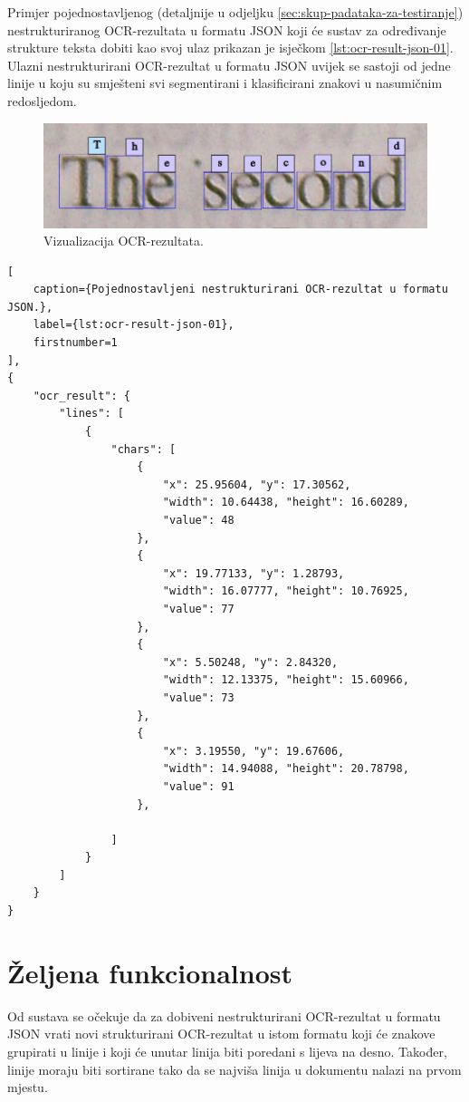 \documentclass[times, utf8, zavrsni]{fer}
\begin{document}
Primjer pojednostavljenog (detaljnije u odjeljku
\ref{sec:skup-padataka-za-testiranje}) nestrukturiranog OCR-rezultata u formatu
JSON koji će sustav za određivanje strukture teksta dobiti kao svoj ulaz
prikazan je isječkom \ref{lst:ocr-result-json-01}. Ulazni nestrukturirani
OCR-rezultat u formatu JSON uvijek se sastoji od jedne linije u koju
su smješteni svi segmentirani i klasificirani znakovi u nasumičnim redosljedom.

\begin{figure}[htb]
    \centering
    \includegraphics[width=\textwidth]{images/book-example-02.png}
    \caption{Vizualizacija OCR-rezultata.}
    \label{fig:book-example-02}
\end{figure}

\begin{lstlisting}[
    caption={Pojednostavljeni nestrukturirani OCR-rezultat u formatu JSON.},
    label={lst:ocr-result-json-01},
    firstnumber=1
],
{
    "ocr_result": {
        "lines": [
            {
                "chars": [
                    {
                        "x": 25.95604, "y": 17.30562,
                        "width": 10.64438, "height": 16.60289,
                        "value": 48
                    },
                    {
                        "x": 19.77133, "y": 1.28793,
                        "width": 16.07777, "height": 10.76925,
                        "value": 77
                    },
                    {
                        "x": 5.50248, "y": 2.84320,
                        "width": 12.13375, "height": 15.60966,
                        "value": 73
                    },
                    {
                        "x": 3.19550, "y": 19.67606,
                        "width": 14.94088, "height": 20.78798,
                        "value": 91
                    },

                ]
            }
        ]
    }
}
\end{lstlisting}








\section{Željena funkcionalnost}
\label{sec:željena-funkcionalnost}
Od sustava se očekuje da za dobiveni nestrukturirani OCR-rezultat u formatu
JSON vrati novi strukturirani OCR-rezultat u istom formatu koji će znakove
grupirati u linije i koji će unutar linija biti poredani s lijeva na desno.
Također, linije moraju biti sortirane tako da se najviša linija u dokumentu
nalazi na prvom mjestu.
\end{document}
